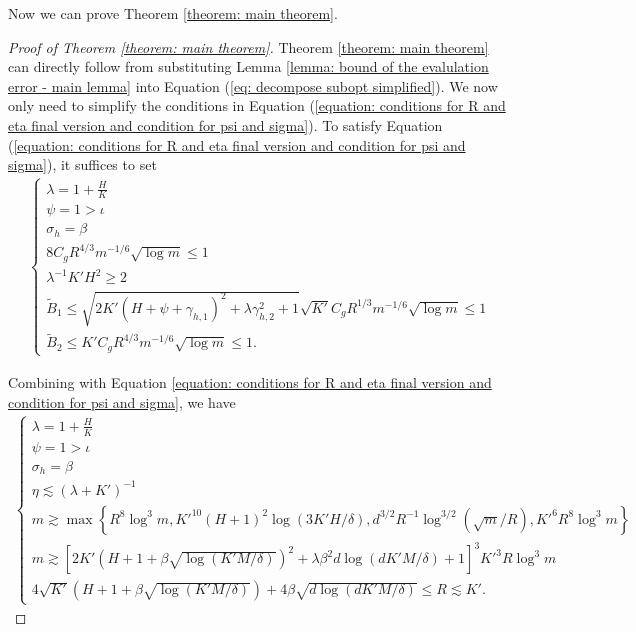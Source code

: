\documentclass{article} \usepackage{iclr2023/iclr2023_conference,times}
\begin{document}
Now we can prove Theorem \ref{theorem: main theorem}. 
\begin{proof}[Proof of Theorem \ref{theorem: main theorem}]
Theorem \ref{theorem: main theorem} can directly follow from substituting Lemma \ref{lemma: bound of the evalulation error - main lemma} into Equation (\ref{eq: decompose subopt simplified}). We now only need to simplify the conditions in Equation (\ref{equation: conditions for R and eta final version and condition for psi and sigma}). To satisfy Equation (\ref{equation: conditions for R and eta final version and condition for psi and sigma}), it suffices to set
\begin{align*}
    \begin{cases}
    \lambda = 1 + \frac{H}{K} \\ 
    \psi = 1 >  \iota \\ 
    \sigma_h = \beta \\
    8 C_g R^{4/3} m^{-1/6} \sqrt{ \log m} \leq 1 \\
    \lambda^{-1}K' H^2 \geq 2 \\ 
    \tilde{B}_1  \leq \sqrt{   2K'(H + \psi + \gamma_{h,1} )^2 + \lambda \gamma_{h,2}^2 + 1} \sqrt{K'} C_g R^{1/3} m^{-1/6} \sqrt{ \log m} \leq 1 \\ 
    \tilde{B}_2 \leq K' C_g R^{4/3} m^{-1/6} \sqrt{\log m} \leq 1.
    \end{cases}
\end{align*}

Combining with Equation \ref{equation: conditions for R and eta final version and condition for psi and sigma}, we have
\begin{align}
\begin{cases}
    \lambda = 1 + \frac{H}{K} \\ 
    \psi = 1 > \iota \\ 
    \sigma_h = \beta \\
    \eta \lesssim (\lambda + K')^{-1} \\
    m \gtrsim \max\left\{ R^8 \log^3 m, K'^{10} (H + 1)^2 \log(3 K'H/\delta), d^{3/2}  R^{-1} \log^{3/2} (\sqrt{m} /R), K'^6  R^8 \log^3 m  \right\} \\ 
    m \gtrsim [2K'(H + 1 + \beta \sqrt{\log (K' M / \delta)} )^2 + \lambda \beta^2 d \log (d K' M / \delta) + 1]^3 K'^3 R \log^3 m \\ 
      4 \sqrt{K'} (H + 1 + \beta \sqrt{\log (K' M / \delta)}) +  4 \beta \sqrt{ d \log (d K' M / \delta)} \leq R \lesssim K'.  
\end{cases}
\label{eq: final parameter conditions simplified}
\end{align}


\end{proof}
\end{document}
